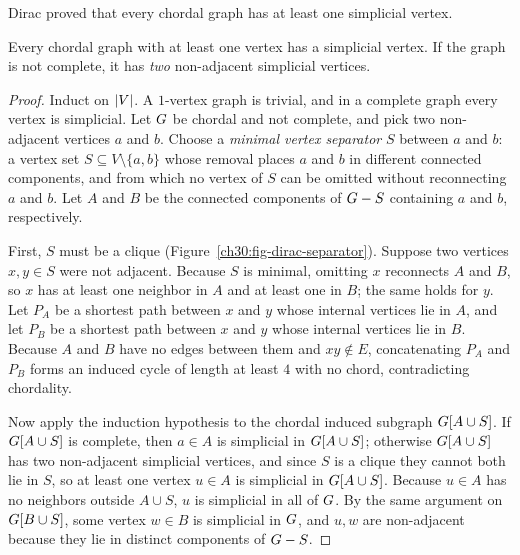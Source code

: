 Dirac proved that every chordal graph has at least one simplicial vertex.

\begin{theorem}[Dirac 1961]\label{ch30:thm-dirac}
Every chordal graph with at least one vertex has a simplicial vertex. If the graph is not complete, it has \emph{two} non-adjacent simplicial vertices.
\end{theorem}

\begin{proof}
Induct on $\lvert V\rvert$. A $1$-vertex graph is trivial, and in a complete graph every vertex is simplicial. Let $G$ be chordal and not complete, and pick two non-adjacent vertices $a$ and $b$. Choose a \emph{minimal vertex separator} $S$ between $a$ and $b$: a vertex set $S\subseteq V\setminus\{a,b\}$ whose removal places $a$ and $b$ in different connected components, and from which no vertex of $S$ can be omitted without reconnecting $a$ and $b$. Let $A$ and $B$ be the connected components of $G-S$ containing $a$ and $b$, respectively.

First, $S$ must be a clique (Figure~\ref{ch30:fig-dirac-separator}). Suppose two vertices $x,y\in S$ were not adjacent. Because $S$ is minimal, omitting $x$ reconnects $A$ and $B$, so $x$ has at least one neighbor in $A$ and at least one in $B$; the same holds for $y$. Let $P_A$ be a shortest path between $x$ and $y$ whose internal vertices lie in $A$, and let $P_B$ be a shortest path between $x$ and $y$ whose internal vertices lie in $B$. Because $A$ and $B$ have no edges between them and $xy\notin E$, concatenating $P_A$ and $P_B$ forms an induced cycle of length at least $4$ with no chord, contradicting chordality.

Now apply the induction hypothesis to the chordal induced subgraph $G[A\cup S]$. If $G[A\cup S]$ is complete, then $a\in A$ is simplicial in $G[A\cup S]$; otherwise $G[A\cup S]$ has two non-adjacent simplicial vertices, and since $S$ is a clique they cannot both lie in $S$, so at least one vertex $u\in A$ is simplicial in $G[A\cup S]$. Because $u\in A$ has no neighbors outside $A\cup S$, $u$ is simplicial in all of $G$. By the same argument on $G[B\cup S]$, some vertex $w\in B$ is simplicial in $G$, and $u,w$ are non-adjacent because they lie in distinct components of $G-S$.
\end{proof}


